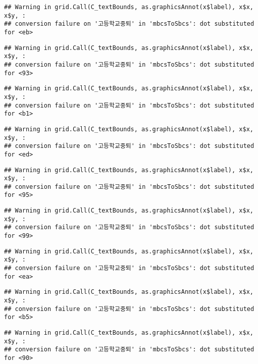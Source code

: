\documentclass[
]{article}
\begin{document}
\begin{verbatim}
## Warning in grid.Call(C_textBounds, as.graphicsAnnot(x$label), x$x, x$y, :
## conversion failure on '고등학교중퇴' in 'mbcsToSbcs': dot substituted for <eb>
\end{verbatim}

\begin{verbatim}
## Warning in grid.Call(C_textBounds, as.graphicsAnnot(x$label), x$x, x$y, :
## conversion failure on '고등학교중퇴' in 'mbcsToSbcs': dot substituted for <93>
\end{verbatim}

\begin{verbatim}
## Warning in grid.Call(C_textBounds, as.graphicsAnnot(x$label), x$x, x$y, :
## conversion failure on '고등학교중퇴' in 'mbcsToSbcs': dot substituted for <b1>
\end{verbatim}

\begin{verbatim}
## Warning in grid.Call(C_textBounds, as.graphicsAnnot(x$label), x$x, x$y, :
## conversion failure on '고등학교중퇴' in 'mbcsToSbcs': dot substituted for <ed>
\end{verbatim}

\begin{verbatim}
## Warning in grid.Call(C_textBounds, as.graphicsAnnot(x$label), x$x, x$y, :
## conversion failure on '고등학교중퇴' in 'mbcsToSbcs': dot substituted for <95>
\end{verbatim}

\begin{verbatim}
## Warning in grid.Call(C_textBounds, as.graphicsAnnot(x$label), x$x, x$y, :
## conversion failure on '고등학교중퇴' in 'mbcsToSbcs': dot substituted for <99>
\end{verbatim}

\begin{verbatim}
## Warning in grid.Call(C_textBounds, as.graphicsAnnot(x$label), x$x, x$y, :
## conversion failure on '고등학교중퇴' in 'mbcsToSbcs': dot substituted for <ea>
\end{verbatim}

\begin{verbatim}
## Warning in grid.Call(C_textBounds, as.graphicsAnnot(x$label), x$x, x$y, :
## conversion failure on '고등학교중퇴' in 'mbcsToSbcs': dot substituted for <b5>
\end{verbatim}

\begin{verbatim}
## Warning in grid.Call(C_textBounds, as.graphicsAnnot(x$label), x$x, x$y, :
## conversion failure on '고등학교중퇴' in 'mbcsToSbcs': dot substituted for <90>
\end{verbatim}
\end{document}
